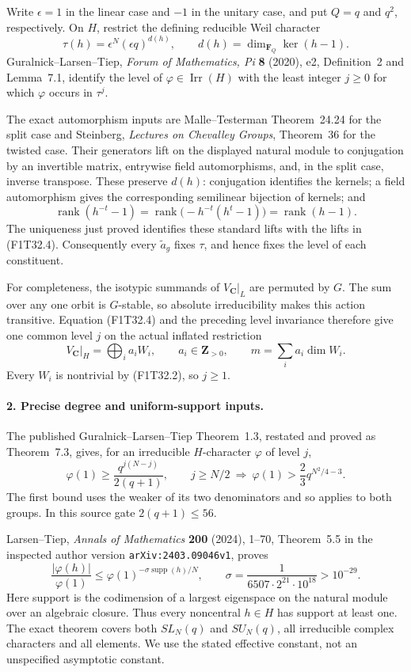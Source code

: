 Write \(\epsilon=1\) in the linear case and \(-1\) in
the unitary case, and put \(Q=q\) and \(q^2\), respectively.
On \(H\), restrict the defining reducible Weil character
\[
 \tau(h)=\epsilon^N(\epsilon q)^{d(h)},
 \qquad d(h)=\dim_{\mathbf F_Q}\ker(h-1).
 \tag{F1T32.5}
\]
Guralnick--Larsen--Tiep, \emph{Forum of Mathematics, Pi}
\textbf{8} (2020), e2, Definition~2 and Lemma~7.1,
identify the level of \(\varphi\in\operatorname{Irr}(H)\)
with the least integer \(j\ge0\) for which
\(\varphi\) occurs in \(\tau^j\).

The exact automorphism inputs are Malle--Testerman
Theorem~24.24 for the split case and Steinberg,
\emph{Lectures on Chevalley Groups}, Theorem~36 for the
twisted case. Their generators lift on the displayed
natural module to conjugation by an invertible matrix,
entrywise field automorphisms, and, in the split case,
inverse transpose. These preserve \(d(h)\): conjugation
identifies the kernels; a field automorphism gives the
corresponding semilinear bijection of kernels; and
\[
 \operatorname{rank}(h^{-t}-1)
 =\operatorname{rank}\bigl(-h^{-t}(h^t-1)\bigr)
 =\operatorname{rank}(h-1).
 \tag{F1T32.6}
\]
The uniqueness just proved identifies these standard
lifts with the lifts in (F1T32.4). Consequently every
\(\widetilde a_g\) fixes \(\tau\), and hence fixes
the level of each constituent.

For completeness, the isotypic summands of
\(V_{\mathbf C}|_L\) are permuted by \(G\).
The sum over any one orbit is \(G\)-stable, so absolute
irreducibility makes this action transitive.
Equation (F1T32.4) and the preceding level invariance
therefore give one common level \(j\) on the actual
inflated restriction
\[
 V_{\mathbf C}|_H=\bigoplus_i a_i W_i,
 \qquad a_i\in\mathbf Z_{>0},\qquad
 m=\sum_i a_i\dim W_i.
 \tag{F1T32.7}
\]
Every \(W_i\) is nontrivial by (F1T32.2), so \(j\ge1\).

\paragraph{2. Precise degree and uniform-support inputs.}
The published Guralnick--Larsen--Tiep Theorem~1.3,
restated and proved as Theorem~7.3, gives, for an
irreducible \(H\)-character \(\varphi\) of level \(j\),
\[
 \varphi(1)\ge\frac{q^{j(N-j)}}{2(q+1)},
 \qquad
 j\ge N/2\ \Longrightarrow\
 \varphi(1)>\frac23q^{N^2/4-3}.
 \tag{F1T32.8}
\]
The first bound uses the weaker of its two denominators
and so applies to both groups. In this source gate
\(2(q+1)\le56\).

Larsen--Tiep, \emph{Annals of Mathematics}
\textbf{200} (2024), 1--70, Theorem~5.5 in the inspected
author version \texttt{arXiv:2403.09046v1}, proves
\[
 \frac{|\varphi(h)|}{\varphi(1)}
 \le\varphi(1)^{-\sigma\operatorname{supp}(h)/N},
 \qquad
 \sigma=\frac1{6507\cdot2^{21}\cdot10^{18}}>10^{-29}.
 \tag{F1T32.9}
\]
Here support is the codimension of a largest eigenspace
on the natural module over an algebraic closure. Thus
every noncentral \(h\in H\) has support at least one.
The exact theorem covers both \(SL_N(q)\) and
\(SU_N(q)\), all irreducible complex characters and
all elements. We use the stated effective constant,
not an unspecified asymptotic constant.

